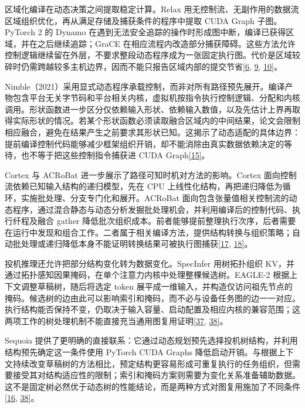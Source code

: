\documentclass[UTF8,11pt,fontset=windows]{ctexart}
\begin{document}
区域化编译在动态决策之间提取稳定计算。Relax 用无控制流、无副作用的数据流区域组织优化，再从满足存储及捕获条件的程序中提取 CUDA Graph 子图。PyTorch 2 的 Dynamo 在遇到无法安全追踪的操作时形成图中断，编译已获得区域，并在之后继续追踪；GraCE 在相应流程内改造部分捕获障碍。这些方法允许控制逻辑继续留在外层，不要求整段动态程序成为一张固定执行图。代价是区域较碎时仍需跨越较多主机边界，因而不能只报告区域内部的提交节省\protect\hyperlink{ref-6}{{[}6}, \protect\hyperlink{ref-9}{9}, \protect\hyperlink{ref-10}{10{]}}。

Nimble（2021）采用显式动态程序承载控制，而非对所有路径预先展开。编译产物包含平台无关字节码和平台相关内核，虚拟机按指令执行控制逻辑、分配和内核调用。形状函数进一步区分仅依赖输入形状、依赖输入数值，以及先估计上界再取得实际形状的情况。若某个形状函数必须读取融合区域内的中间结果，论文会限制相应融合，避免在结果产生之前要求其形状已知。这揭示了动态适配的具体边界：提前编译控制代码能够减少框架组织开销，却不能消除由真实数据依赖决定的等待，也不等于把这些控制指令捕获进 CUDA Graph\protect\hyperlink{ref-15}{{[}15{]}}。

Cortex 与 ACRoBat 进一步展示了路径可知时机对方法的影响。Cortex 面向控制流依赖已知输入结构的递归模型，先在 CPU 上线性化结构，再把递归降低为循环，实施批处理、分支专门化和展开。ACRoBat 面向包含张量值相关控制流的动态程序，通过混合静态与动态分析发掘批处理机会，并利用编译后的控制代码、执行纤程及融合 gather 降低批次组织成本。前者能够提前整理执行次序，后者需要在运行中发现和组合工作。二者属于相关编译方法，提供结构转换与组织策略；自动批处理或递归降低本身不能证明转换结果可被执行图捕获\protect\hyperlink{ref-17}{{[}17}, \protect\hyperlink{ref-18}{18{]}}。

投机推理还允许把部分结构变化转为数据变化。SpecInfer 用树拓扑组织 KV，并通过拓扑感知因果掩码，在单个注意力内核中处理整棵候选树。EAGLE-2 根据上下文调整草稿树，随后将选定 token 展平成一维输入，并构造仅访问祖先节点的掩码。候选树的边由此可以影响索引和掩码，而不必与设备任务图的边一一对应。执行结构能否保持不变，仍取决于输入容量、启动配置及相应内核的兼容范围；这两项工作的树处理机制不能直接充当通用图复用证明\protect\hyperlink{ref-37}{{[}37}, \protect\hyperlink{ref-38}{38{]}}。

Sequoia 提供了更明确的直接联系：它通过动态规划预先选择投机树结构，并利用结构预先确定这一条件使用 PyTorch CUDA Graphs 降低启动开销。与根据上下文持续改变草稿树的方法相比，预定结构更容易形成可重复执行的任务组织，但需要接受其对结构适应性的限制；索引和掩码方案则需要为变化关系准备辅助数据。这不是固定树必然优于动态树的性能结论，而是两种方式对图复用施加了不同条件\protect\hyperlink{ref-16}{{[}16}, \protect\hyperlink{ref-38}{38{]}}。
\end{document}

